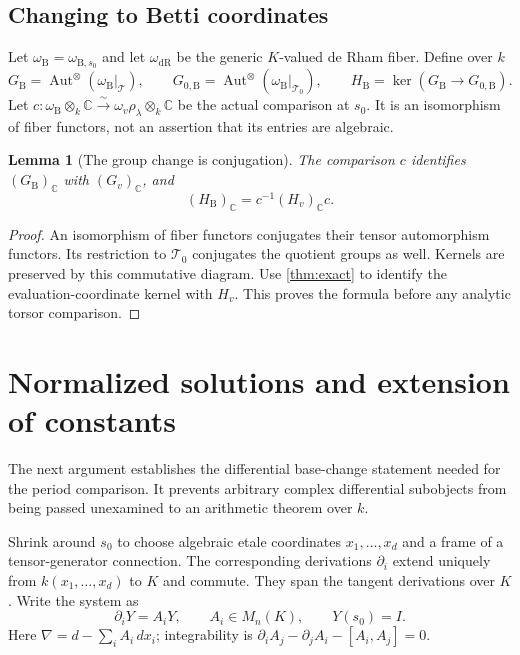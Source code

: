 \documentclass[11pt]{article}
\numberwithin{equation}{section}
\newtheorem{lemma}[lemma]{Lemma}
\theoremstyle{definition}
\theoremstyle{remark}
\newcommand{\C}{\mathbb C}
\newcommand{\Tcal}{\mathcal T}
\newcommand{\Aut}{\operatorname{Aut}}
\newcommand{\dR}{\mathrm{dR}}
\newcommand{\B}{\mathrm B}
\begin{document}
\subsection{Changing to Betti coordinates}

Let $\omega_\B=\omega_{\B,s_0}$ and let $\omega_\dR$ be the generic
$K$-valued de Rham fiber. Define over $k$
\begin{equation}\label{eq:betti-groups}
 G_\B=\Aut^\otimes(\omega_\B|_\Tcal),\qquad
 G_{0,\B}=\Aut^\otimes(\omega_\B|_{\Tcal_0}),\qquad
 H_\B=\ker(G_\B\to G_{0,\B}).
\end{equation}
Let $c:\omega_\B\otimes_k\C\xrightarrow{\sim}
\omega_v\rho_\lambda\otimes_k\C$ be the actual comparison at $s_0$.
It is an isomorphism of fiber functors, not an assertion that its entries
are algebraic.

\begin{lemma}[The group change is conjugation]\label{lem:conjugation}
The comparison $c$ identifies $(G_\B)_\C$ with $(G_v)_\C$, and
\[
 (H_\B)_\C=c^{-1}(H_v)_\C c.
\]
\end{lemma}
\begin{proof}
An isomorphism of fiber functors conjugates their tensor automorphism
functors. Its restriction to $\Tcal_0$ conjugates the quotient groups
as well. Kernels are preserved by this commutative diagram. Use
\cref{thm:exact} to identify the evaluation-coordinate kernel with
$H_v$. This proves the formula before any analytic torsor comparison.
\end{proof}

\section{Normalized solutions and extension of constants}\label{sec:pv-base-change}

The next argument establishes the differential base-change statement
needed for the period comparison. It prevents arbitrary complex differential
subobjects from being passed unexamined to an arithmetic theorem over $k$.

Shrink around $s_0$ to choose algebraic etale coordinates
$x_1,\ldots,x_d$ and a frame of a tensor-generator connection. The
corresponding derivations $\partial_i$ extend uniquely from
$k(x_1,\ldots,x_d)$ to $K$ and commute. They span the tangent derivations
over $K$. Write the system as
\begin{equation}\label{eq:system}
 \partial_iY=A_iY,\qquad A_i\in M_n(K),\qquad Y(s_0)=I.
\end{equation}
Here $\nabla=d-\sum_iA_i\,dx_i$; integrability is
$\partial_iA_j-\partial_jA_i-[A_i,A_j]=0$.
\end{document}
